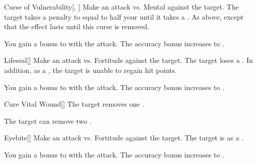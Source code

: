 \lowercase{\hypertarget{spell:Curse of Vulnerability}{}}\label{spell:Curse of Vulnerability}
\begin{freeability}[Rank 4]{\hypertarget{spell:Curse of Vulnerability}{Curse of Vulnerability}}[, ]
Make an attack vs. Mental against the target.
\hit The target takes a penalty to  equal to half your  until it takes a .
\crit As above, except that the effect lasts until this curse is removed.

\rankline
{} You gain a  bonus to  with the attack.
 The accuracy bonus increases to .
\end{freeability}
\vspace{0.25em}



\lowercase{\hypertarget{spell:Lifeseal}{}}\label{spell:Lifeseal}
\begin{freeability}[Rank 4]{\hypertarget{spell:Lifeseal}{Lifeseal}}[]
Make an attack vs. Fortitude against the target.
\hit The target loses a .
In addition, as a , the target is unable to regain hit points.

\rankline
{} You gain a  bonus to  with the attack.
 The accuracy bonus increases to .
\end{freeability}
\vspace{0.25em}



\lowercase{\hypertarget{spell:Cure Vital Wound}{}}\label{spell:Cure Vital Wound}
\begin{apability}[Rank 5]{\hypertarget{spell:Cure Vital Wound}{Cure Vital Wound}}[]
The target removes one .

\rankline
{} The target can remove two .
\end{apability}
\vspace{0.25em}



\lowercase{\hypertarget{spell:Eyebite}{}}\label{spell:Eyebite}
\begin{freeability}[Rank 5]{\hypertarget{spell:Eyebite}{Eyebite}}[]
Make an attack vs. Fortitude against the target.
\hit The target is  as a .

\rankline
{} You gain a  bonus to  with the attack.
 The accuracy bonus increases to .
\end{freeability}
\vspace{0.25em}




